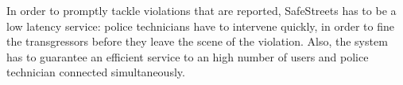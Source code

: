 
In order to promptly tackle violations that are reported,
SafeStreets has to be a low latency service: police technicians have
to intervene quickly, in order to fine the transgressors before they
leave the scene of the violation. Also, the system has to guarantee an
efficient service to an high number of users and police technician connected
simultaneously.